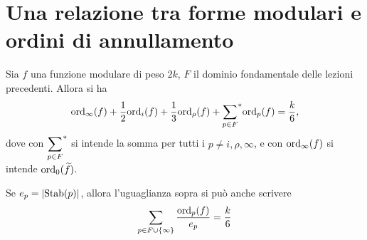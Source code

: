 
\section{Una relazione tra forme modulari e ordini di annullamento}

\begin{teorema} \label{170201-forme-ordini}
	Sia $f$ una funzione modulare di peso $2k$, $F$ il dominio fondamentale delle lezioni precedenti. Allora si ha
	\begin{equation*}
	\text{ord}_\infty(f)+\frac{1}{2}\text{ord}_i(f)+\frac{1}{3}\text{ord}_{\rho}(f)+{\sum_{p\in F}}^{*}\text{ord}_p(f)=\frac{k}{6},
	\end{equation*}
	dove con $\displaystyle{\sum_{p\in F}}^{*}$ si intende la somma per tutti i $p \neq i, \rho, \infty$, e con $\text{ord}_\infty(f)$ si intende $\text{ord}_0(\widetilde{f})$.
	
	Se $e_p=\left| \text{Stab}(p) \right|$, allora l'uguaglianza sopra si può anche scrivere
	\begin{equation*}
		\sum_{p\in F \cup \{\infty\}} \frac{\text{ord}_p(f)}{e_p}=\frac{k}{6}
	\end{equation*}
\end{teorema}

